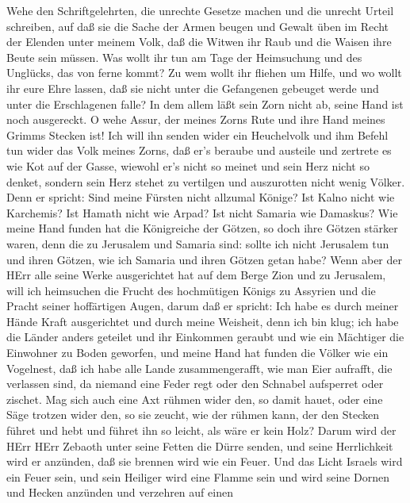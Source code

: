 Wehe den Schriftgelehrten, die unrechte Gesetze machen und
die unrecht Urteil schreiben,  auf daß sie die Sache der
Armen beugen und Gewalt üben im Recht der Elenden unter meinem Volk, daß
die Witwen ihr Raub und die Waisen ihre Beute sein müssen. 
Was wollt ihr tun am Tage der Heimsuchung und des Unglücks, das von
ferne kommt? Zu wem wollt ihr fliehen um Hilfe, und wo wollt ihr eure
Ehre lassen,  daß sie nicht unter die Gefangenen gebeuget
werde und unter die Erschlagenen falle? In dem allem läßt sein Zorn
nicht ab, seine Hand ist noch ausgereckt.  O wehe Assur, der
meines Zorns Rute und ihre Hand meines Grimms Stecken ist! 
Ich will ihn senden wider ein Heuchelvolk und ihm Befehl tun wider das
Volk meines Zorns, daß er's beraube und austeile und zertrete es wie Kot
auf der Gasse,  wiewohl er's nicht so meinet und sein Herz
nicht so denket, sondern sein Herz stehet zu vertilgen und auszurotten
nicht wenig Völker.  Denn er spricht: Sind meine Fürsten
nicht allzumal Könige?  Ist Kalno nicht wie Karchemis? Ist
Hamath nicht wie Arpad? Ist nicht Samaria wie Damaskus? 
Wie meine Hand funden hat die Königreiche der Götzen, so doch ihre
Götzen stärker waren, denn die zu Jerusalem und Samaria sind:
 sollte ich nicht Jerusalem tun und ihren Götzen, wie ich
Samaria und ihren Götzen getan habe?  Wenn aber der HErr
alle seine Werke ausgerichtet hat auf dem Berge Zion und zu Jerusalem,
will ich heimsuchen die Frucht des hochmütigen Königs zu Assyrien und
die Pracht seiner hoffärtigen Augen,  darum daß er spricht:
Ich habe es durch meiner Hände Kraft ausgerichtet und durch meine
Weisheit, denn ich bin klug; ich habe die Länder anders geteilet und ihr
Einkommen geraubt und wie ein Mächtiger die Einwohner zu Boden geworfen,
 und meine Hand hat funden die Völker wie ein Vogelnest,
daß ich habe alle Lande zusammengerafft, wie man Eier aufrafft, die
verlassen sind, da niemand eine Feder regt oder den Schnabel aufsperret
oder zischet.  Mag sich auch eine Axt rühmen wider den, so
damit hauet, oder eine Säge trotzen wider den, so sie zeucht, wie der
rühmen kann, der den Stecken führet und hebt und führet ihn so leicht,
als wäre er kein Holz?  Darum wird der HErr HErr Zebaoth
unter seine Fetten die Dürre senden, und seine Herrlichkeit wird er
anzünden, daß sie brennen wird wie ein Feuer.  Und das
Licht Israels wird ein Feuer sein, und sein Heiliger wird eine Flamme
sein und wird seine Dornen und Hecken anzünden und verzehren auf einen
